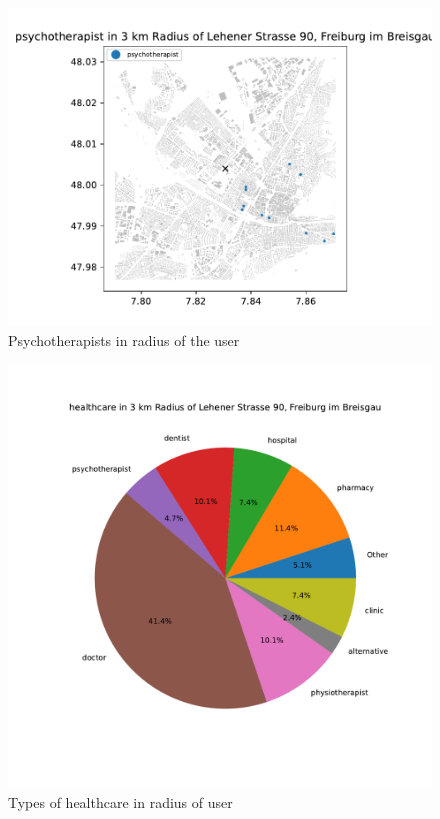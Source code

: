 \documentclass[runningheads]{llncs}
\begin{document}
\begin{figure}
    \includegraphics[width=\textwidth]{../images/freiburg_psychotherapists}
    \caption{Psychotherapists in radius of the user} \label{fig2}
    \end{figure}

\begin{figure}
    \includegraphics[width=\textwidth]{../images/freiburg_healthcare_pie}
    \caption{Types of healthcare in radius of user} \label{fig3}
    \end{figure}
\end{document}
